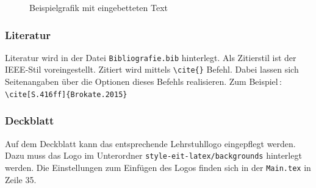 \begin{figure}[ht]
    \centering
    \def\svgwidth{0.6\textwidth}
    
    \caption{Beispielgrafik mit eingebetteten Text}
    \label{fig:Kap_2_1_2_tex}
\end{figure}

\subsubsection{Literatur}\label{sec:2_1_3}
Literatur wird in der Datei \texttt{Bibliografie.bib} hinterlegt.
Als Zitierstil ist der IEEE-Stil voreingestellt.
Zitiert wird mittels \verb|\cite{}| Befehl.
Dabei lassen sich Seitenangaben über die Optionen dieses Befehls realisieren.
Zum Beispiel\,\cite[S.416ff]{Brokate.2015}: \verb|\cite[S.416ff]{Brokate.2015}|

\subsubsection{Deckblatt}\label{sec:2_1_4}
Auf dem Deckblatt kann das entsprechende Lehrstuhllogo eingepflegt werden.
Dazu muss das Logo im Unterordner \texttt{style-eit-latex/backgrounds} hinterlegt werden.
Die Einstellungen zum Einfügen des Logos finden sich in der \texttt{Main.tex} in Zeile 35.